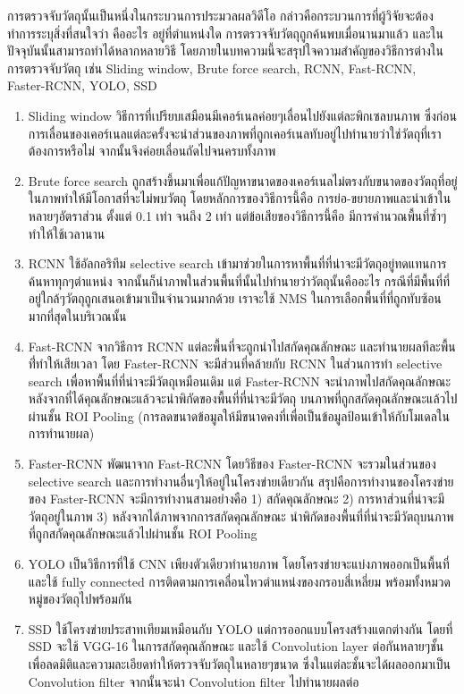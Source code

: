 การตรวจจับวัตถุนั้นเป็นหนึ่งในกระบวนการประมวลผลวิดีโอ\textsuperscript{\cite{object_detection}} กล่าวคือกระบวนการที่ผู้วิจัยจะต้องทำการระบุสิ่งที่สนใจว่า คืออะไร อยู่ที่ตำแหน่งใด การตรวจจับวัตถุถูกค้นพบเมื่อนานมาแล้ว 
และในปัจจุบันนั้นสามารถทำได้หลากหลายวิธี โดยภายในบทความนี้จะสรุปใจความสำคัญของวิธีการต่างในการตรวจจับวัตถุ เช่น Sliding window, Brute force search, RCNN, 
Fast-RCNN, Faster-RCNN, YOLO, SSD 
\begin{enumerate}
	\item Sliding window วิธีการที่เปรียบเสมือนมีเคอร์เนลค่อยๆเลื่อนไปยังแต่ละพิกเซลบนภาพ ซึ่งก่อนการเลื่อนของเคอร์เนลแต่ละครั้งจะนำส่วนของภาพที่ถูกเคอร์เนลทับอยู่ไปทำนายว่าใช่วัตถุที่เราต้องการหรือไม่ 
	จากนั้นจึงค่อยเลื่อนถัดไปจนครบทั้งภาพ
	\item Brute force search ถูกสร้างขึ้นมาเพื่อแก้ปัญหาขนาดของเคอร์เนลไม่ตรงกับขนาดของวัตถุที่อยู่ในภาพทำให้มีโอกาสที่จะไม่พบวัตถุ โดยหลักการของวิธีการนี้คือ 
	การย่อ-ขยายภาพและนำเข้าในหลายๆอัตราส่วน ตั้งแต่ 0.1 เท่า จนถึง 2 เท่า แต่ข้อเสียของวิธีการนี้คือ มีการคำนวณพื้นที่ซ้ำๆทำให้ใช้เวลานาน
	\item RCNN ใช้อัลกอริทึม selective search เข้ามาช่วยในการหาพื้นที่ที่น่าจะมีวัตถุอยู่ทดแทนการค้นหาทุกๆตำแหน่ง จากนั้นก็นำภาพในส่วนพื้นที่นั้นไปทำนายว่าวัตถุนั้นคืออะไร 
	กรณีที่มีพื้นที่ที่อยู่ใกล้ๆวัตถุถูกเสนอเข้ามาเป็นจำนวนมากด้วย เราจะใช้ NMS ในการเลือกพื้นที่ที่ถูกทับซ้อนมากที่สุดในบริเวณนั้น
	\item Fast-RCNN จากวิธีการ RCNN แต่ละพื้นที่จะถูกนำไปสกัดคุณลักษณะ และทำนายผลทีละพื้นที่่ทำให้เสียเวลา โดย Faster-RCNN จะมีส่วนที่คล้ายกับ RCNN ในส่วนการทำ 
	selective search เพื่อหาพื้นที่ที่น่าจะมีวัตถุเหมือนเดิม แต่ Faster-RCNN จะนำภาพไปสกัดคุณลักษณะ หลังจากที่ได้คุณลักษณะแล้วจะนำพิกัดของพื้นที่ที่น่าจะมีวัตถุ 
	บนภาพที่ถูกสกัดคุณลักษณะแล้วไปผ่านชั้น ROI Pooling (การลดขนาดข้อมูลให้มีขนาดคงที่เพื่อเป็นข้อมูลป้อนเข้าให้กับโมเดลในการทำนายผล)
	\item Faster-RCNN พัฒนาจาก Fast-RCNN โดยวิธีของ Faster-RCNN จะรวมในส่วนของ selective search และการทำงานอื่นๆให้อยู่ในโครงข่ายเดียวกัน 
	สรุปคือการทำงานของโครงข่ายของ Faster-RCNN จะมีการทำงานสามอย่างคือ 1) สกัดคุณลักษณะ 2) การหาส่วนที่น่าจะมีวัตถุอยู่ในภาพ 3) หลังจากได้ภาพจากการสกัดคุณลักษณะ 
	นำพิกัดของพื้นที่ที่น่าจะมีวัตถุบนภาพที่ถูกสกัดคุณลักษณะแล้วไปผ่านชั้น ROI Pooling
	\item YOLO เป็นวิธีการที่ใช้ CNN เพียงตัวเดียวทำนายภาพ โดยโครงข่ายจะแบ่งภาพออกเป็นพื้นที่ และใช้ fully connected การติดตามการเคลื่อนไหวตำแหน่งของกรอบสี่เหลี่ยม 
	พร้อมทั้งหมวดหมู่ของวัตถุไปพร้อมกัน 
	\item SSD ใช้โครงข่ายประสาทเทียมเหมือนกับ YOLO แต่การออกแบบโครงสร้างแตกต่างกัน โดยที่ SSD จะใช้ VGG-16 ในการสกัดคุณลักษณะ และใช้ Convolution layer 
	ต่อกันหลายๆชั้นเพื่อลดมิติและความละเอียดทำให้ตรวจจับวัตถุในหลายๆขนาด ซึ่งในแต่ละชั้นจะได้ผลออกมาเป็น Convolution filter จากนั้นจะนำ Convolution filter ไปทำนายผลต่อ
\end{enumerate}